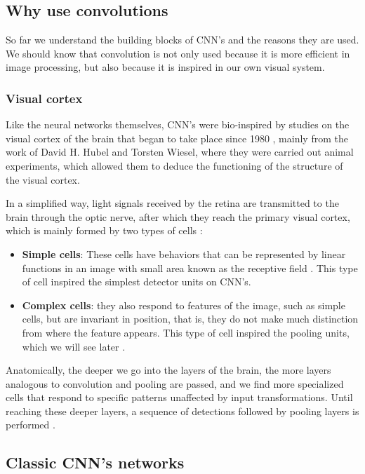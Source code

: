 \subsection{Why use convolutions}

So far we understand the building blocks of CNN's and the reasons they are used. We should know that convolution is not only used because it is more efficient in image processing, but also because it is inspired in our own visual system.

\subsubsection{Visual cortex}

Like the neural networks themselves, CNN's were bio-inspired by studies on the visual cortex of the brain that began to take place since 1980 \cite{geron2019}, mainly from the work of David H. Hubel and Torsten Wiesel, where they were carried out animal experiments, which allowed them to deduce the functioning of the structure of the visual cortex.

In a simplified way, light signals received by the retina are transmitted to the brain through the optic nerve, after which they reach the primary visual cortex, which is mainly formed by two types of cells \cite{goodfellow2016}:

\begin{itemize}
\item \textbf{Simple cells}: These cells have behaviors that can be represented by linear functions in an image with small area known as the receptive field \cite{goodfellow2016} \cite{geron2019}. This type of cell inspired the simplest detector units on CNN's.
\item \textbf{Complex cells}: they also respond to features of the image, such as simple cells, but are invariant in position, that is, they do not make much distinction from where the feature appears. This type of cell inspired the pooling units, which we will see later \cite{goodfellow2016}.
\end{itemize}

Anatomically, the deeper we go into the layers of the brain, the more layers analogous to convolution and pooling are passed, and we find more specialized cells that respond to specific patterns unaffected by input transformations. Until reaching these deeper layers, a sequence of detections followed by pooling layers is performed \cite{goodfellow2016}. 
\subsection{Classic CNN's networks}

